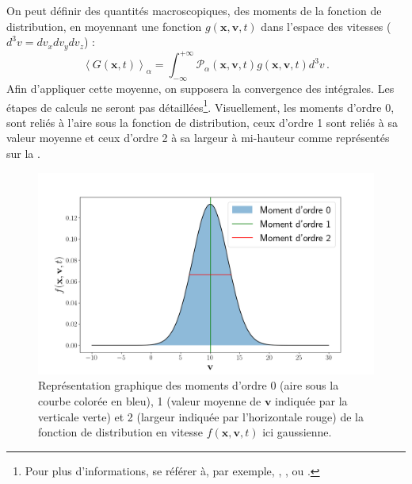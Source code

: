 On peut définir des quantités macroscopiques, des \og moments \fg{} de la fonction de distribution, en moyennant une fonction $g\left(\mathbf{x},\mathbf{v},t\right)$ dans l'espace des vitesses ($d^3v=dv_xdv_ydv_z$) : 
\begin{equation}
 \left<G\left(\mathbf{x},t\right)\right>_{\alpha} = \int^{+\infty}_{-\infty} \mathcal{P}_{\alpha}\left(\mathbf{x},\mathbf{v},t\right) g\left(\mathbf{x},\mathbf{v},t\right) d^3v \, .
\end{equation}
Afin d'appliquer cette moyenne, on supposera la convergence des intégrales. Les étapes de calculs ne seront pas détaillées\footnote{Pour plus d'informations, se référer à, par exemple, \cite{krall_principles_1973},  \cite{rax_physique_2005}, \cite{galtier_introduction_2016} ou \cite{belmont_introduction_2018}.}.
Visuellement, les moments d'ordre 0, sont reliés à l'aire sous la fonction de distribution, ceux d'ordre 1 sont reliés à sa valeur moyenne et ceux d'ordre 2 à sa largeur à mi-hauteur comme représentés sur la . 
\begin{figure}[!ht]
 \centering
\includegraphics[width=0.8\linewidth,trim=2cm 0cm 3cm 1cm, clip=true]{./Mainmatter/Part_0/images/distrib}
\cprotect\caption{Représentation graphique des moments d'ordre 0 (aire sous la courbe colorée en bleu), 1 (valeur moyenne de $\mathbf{v}$ indiquée par la verticale verte) et 2 (largeur indiquée par l'horizontale rouge) de la fonction de distribution en vitesse $f\left(\mathbf{x},\mathbf{v},t\right)$ ici gaussienne.}
\label{fig:distrib}
\end{figure}
 

